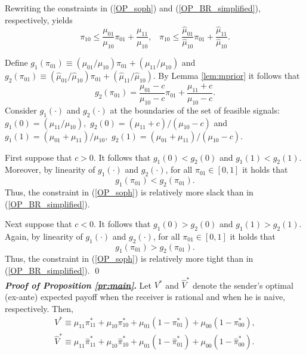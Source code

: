 \documentclass[12pt,english]{article}
\theoremstyle{plain}
\begin{document}
\begin{appendices}

Rewriting the constraints in (\ref{OP_soph}) and (\ref{OP_BR_simplified}), respectively, yields
\[
\pi_{10}\leq\frac{\mu_{01}}{\mu_{10}}\pi_{01}+\frac{\mu_{11}}{\mu_{10}}, \hspace{10pt} \pi_{10}\leq\frac{\hat{\mu}_{01}}{\hat{\mu}_{10}}\pi_{01}+\frac{\hat{\mu}_{11}}{\hat{\mu}_{10}}.
\]

Define $g_{1}\left(\pi_{01}\right)\equiv(\mu_{01}/\mu_{10})\pi_{01}+(\mu_{11}/\mu_{10})$ and $g_{2}\left(\pi_{01}\right)\equiv(\hat{\mu}_{01}/\hat{\mu}_{10})\pi_{01}+(\hat{\mu}_{11}/\hat{\mu}_{10})$.
By Lemma \ref{lem:mprior} it follows that
\[
g_{2}\left(\pi_{01}\right)=\frac{\mu_{01}-c}{\mu_{10}-c}\pi_{01}+\frac{\mu_{11}+c}{\mu_{10}-c}.
\]
Consider $g_{1}\left(\cdot\right)$ and $g_{2}\left(\cdot\right)$ at the
boundaries of the set of feasible signals: $g_{1}\left(0\right)=(\mu_{11}/\mu_{10}),$
$g_{2}\left(0\right)=(\mu_{11}+c)/(\mu_{10}-c)$ and $g_{1}\left(1\right)=(\mu_{01}+\mu_{11})/\mu_{10},$
$g_{2}\left(1\right)=(\mu_{01}+\mu_{11})/(\mu_{10}-c)$.

First suppose that $c>0$. 
It follows that $g_{1}\left(0\right)<g_{2}\left(0\right)$
and $g_{1}\left(1\right)<g_{2}\left(1\right)$. 
Moreover, by linearity
of $g_{1}\left(\cdot\right)$ and $g_{2}\left(\cdot\right)$, for all $\pi_{01}\in[0,1]$ it holds that
\[
g_{1}\left(\pi_{01}\right)<g_{2}\left(\pi_{01}\right).
\]
Thus, the constraint in (\ref{OP_soph}) is relatively more slack than in (\ref{OP_BR_simplified}).

Next suppose that $c<0$. 
It follows that $g_{1}\left(0\right)>g_{2}\left(0\right)$
and $g_{1}\left(1\right)>g_{2}\left(1\right)$. 
Again, by linearity
of $g_{1}\left(\cdot\right)$ and $g_{2}\left(\cdot\right)$, for all $\pi_{01}\in[0,1]$ it holds that
\[
g_{1}\left(\pi_{01}\right)>g_{2}\left(\pi_{01}\right).
\]
Thus, the constraint in (\ref{OP_soph}) is relatively more tight than in (\ref{OP_BR_simplified}).
\qed \\


\noindent\textbf{\emph{Proof of Proposition \ref{pr:main}}.} 
Let $V^*$ and $\hat V^*$ denote the sender's optimal (ex-ante) expected payoff when the receiver is rational and when he is naive, respectively. 
Then,
\[
\begin{aligned}
V^{*}\equiv\mu_{11}\pi_{11}^{*}+\mu_{10}\pi_{10}^{*}+\mu_{01}(1-\pi_{01}^{*})+\mu_{00}(1-\pi_{00}^{*}),\\
\hat{V}^{*}\equiv\mu_{11}\hat{\pi}_{11}^{*}+\mu_{10}\hat{\pi}_{10}^{*}+\mu_{01}(1-\hat{\pi}_{01}^{*})+\mu_{00}(1-\hat{\pi}_{00}^{*}).
\end{aligned}\]


\end{appendices}
\end{document}
